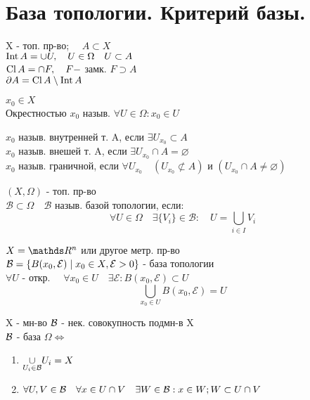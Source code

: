 \documentclass[geometry.tex]{subfiles}
\begin{document}
  \section{База топологии. Критерий базы.}

  \begin{definition}
      X - топ. пр-во; $\quad A \subset X$ \\
      $\mathop{\rm Int}\nolimits A = \cup U, \quad U \in \Omega \quad U \subset A$\\
      $\mathop{\rm Cl}\nolimits A = \cap F, \quad F - $ замк. $F \supset A$ \\
      $\partial A = \mathop{\rm Cl}\nolimits A \setminus \mathop{\rm Int}\nolimits A$
  \end{definition}

  \begin{definition}
      $x_0 \in X$\\
      Окрестностью $x_0$ назыв. $\forall U \in \Omega: x_0 \in U$
  \end{definition}

  \begin{definition}
      $x_0$ назыв. внутренней т. A, если $\exists U_{x_0} \subset A$\\
      $x_0$ назыв. внешей т. A, если $\exists U_{x_0} \cap A = \varnothing$\\
      $x_0$ назыв. граничной, если $\forall U_{x_0} \quad (U_{x_0} \not \subset A)$ и $(U_{x_0} \cap A \neq \varnothing)$
  \end{definition}

  \begin{definition}
      $(X, \Omega)$ - топ. пр-во\\
      $\mathcal{B} \subset \Omega \quad \mathcal{B}$ назыв. базой топологии, если:\\
      \[\forall U \in \Omega \quad \exists \{V_i\} \in \mathcal{B}: \quad U = \bigcup_{i \in I} V_i\]
  \end{definition}

  \begin{example}
      $X = \R^n$ или другое метр. пр-во\\
      $\mathcal{B} = \{B(x_0, \mathcal{E}) \; | \; x_0 \in X, \mathcal{E} > 0\}$ - база топологии\\
      $\forall U$ - откр. $\quad \forall x_0 \in U \quad \exists \mathcal{E}: B(x_0, \mathcal{E}) \subset U$\\
      \[\bigcup_{x_0 \in U} B(x_0, \mathcal{E}) = U\]
  \end{example}

  \begin{theorem}
      X - мн-во $\mathcal{B}$ - нек. совокупность подмн-в X\\
      $\mathcal{B}$ - база $\Omega \Leftrightarrow$ \begin{enumerate}
          \item $\underset{U_i \in \mathcal{B}}{\cup} U_i = X$
          \item $\forall U, V \in \mathcal{B} \quad \forall x \in U \cap V \quad \exists W \in \mathcal{B} : x \in W; W \subset U\cap V$
      \end{enumerate}
  \end{theorem}
\end{document}

